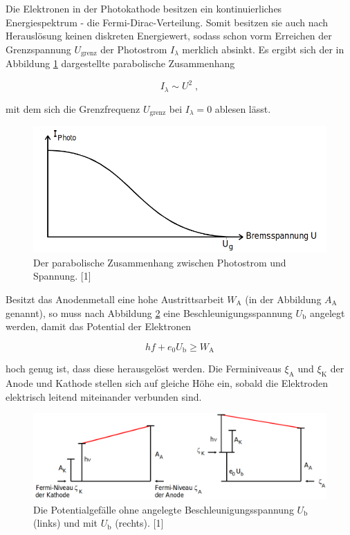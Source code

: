 
 Die Elektronen in der Photokathode besitzen ein kontinuierliches Energiespektrum - die
 Fermi-Dirac-Verteilung. Somit besitzen sie auch nach Herauslösung keinen diskreten 
 Energiewert, sodass schon vorm Erreichen der Grenzspannung $U_\text{grenz}$ der Photostrom $I_\lambda$ 
 merklich absinkt.
 Es ergibt sich der in Abbildung \ref{fig:bild3} dargestellte parabolische Zusammenhang 

 \begin{equation}
     I_\lambda \sim U^2 \; ,
     \label{eqn:photostrom}
 \end{equation}

mit dem sich die Grenzfrequenz $U_\text{grenz}$ bei $I_\lambda = 0$ ablesen lässt.

\begin{figure}
    \centering
    \includegraphics[scale=0.37]{content/bild3.png}
    \caption{Der parabolische Zusammenhang zwischen Photostrom und Spannung. [1]}
    \label{fig:bild3}
\end{figure}

Besitzt das Anodenmetall eine hohe Austrittsarbeit $W_\text{A}$ (in der Abbildung $A_\text{A}$ genannt), 
so muss nach Abbildung \ref{fig:bild4} 
eine Beschleunigungsspannung $U_\text{b}$ angelegt werden, damit
das Potential der Elektronen

\begin{equation}
    h f + e_0 U_\text{b} \geq W_\text{A}
\end{equation}

hoch genug ist, dass diese herausgelöst werden.
Die Ferminiveaus $\xi_\text{A}$ und $\xi_\text{K}$ der Anode und Kathode stellen
sich auf gleiche Höhe ein, sobald die Elektroden elektrisch leitend miteinander
verbunden sind.

\begin{figure}
    \centering
    \includegraphics[scale=0.37]{content/bild4.png}
    \caption{Die Potentialgefälle ohne angelegte Beschleunigungsspannung $U_\text{b}$ (links) und mit
    $U_\text{b}$ (rechts). [1]}
    \label{fig:bild4}
\end{figure}




